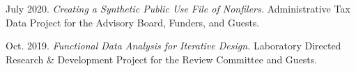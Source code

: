 \begin{etaremune}[topsep=0pt, itemsep=4pt, partopsep=0pt, parsep=0pt]
    \item July 2020. \textit{Creating a Synthetic Public Use File of Nonfilers.} Administrative Tax Data Project for the Advisory Board, Funders, and Guests.
    
    \item Oct. 2019. \textit{Functional Data Analysis for Iterative Design.} Laboratory Directed Research \& Development Project for the Review Committee and Guests.
\end{etaremune}

